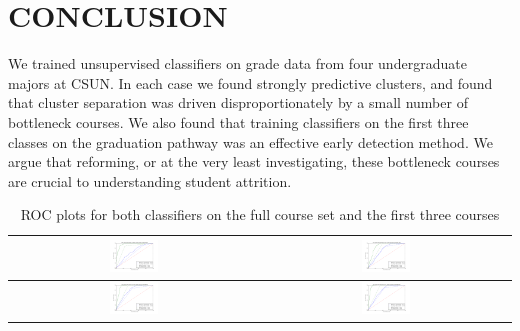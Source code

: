 \documentclass{sigchi}
\begin{document}
\section{CONCLUSION}

We trained unsupervised classifiers on grade data from four undergraduate majors at CSUN. In each case we found strongly predictive clusters, and found that cluster separation was driven disproportionately by a small number of bottleneck courses. We also found that training classifiers on the first three classes on the graduation pathway was an effective early detection method. We argue that reforming, or at the very least investigating, these bottleneck courses are crucial to understanding student attrition.
\begin{table}[h!]
 \begin{center}
   \begin{tabular}{| c | c |}
   \hline
   \includegraphics[width=0.2\textwidth]{figures/ROC-Economics.png}
   &
   \includegraphics[width=0.2\textwidth]{figures/ROC-Business-Law.png}
   \\
   \hline
   \includegraphics[width=0.2\textwidth]{figures/roc-marketing.png}
	&   
   \includegraphics[width=0.2\textwidth]{figures/roc-management.png}
   \\
   \hline
   \end{tabular}
 \end{center}
 \caption{ROC plots for both classifiers on the full course set and the first three courses }~\label{tab:rocTable}
\end{table}
\end{document}
